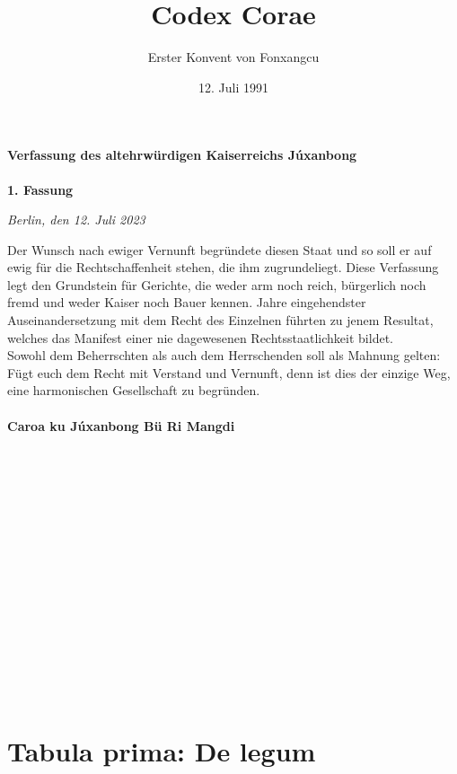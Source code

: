 \documentclass{article}
\title{Codex Corae}
\author{Erster Konvent von Fonxangcu}
\date{12. Juli 1991}
\begin{document}
\maketitle
\vspace*{\fill}
\paragraph{Verfassung des altehrwürdigen Kaiserreichs Júxanbong}

\newpage
{}
\vspace*{\fill}
\begin{Center}
\textbf{1. Fassung}
\end{Center}
\begin{flushright}
\textit{Berlin, den 12. Juli 2023}
\end{flushright}
Der Wunsch nach ewiger Vernunft begründete diesen Staat und so soll er auf ewig für die Rechtschaffenheit stehen, die ihm zugrundeliegt.
Diese Verfassung legt den Grundstein für Gerichte, die weder arm noch reich, bürgerlich noch fremd und weder Kaiser noch Bauer kennen.
Jahre eingehendster Auseinandersetzung mit dem Recht des Einzelnen führten zu jenem Resultat, welches das Manifest einer nie dagewesenen
Rechtsstaatlichkeit bildet.\\
Sowohl dem Beherrschten als auch dem Herrschenden soll als Mahnung gelten: Fügt euch dem Recht mit Verstand und Vernunft, denn ist dies der einzige Weg, eine
harmonischen Gesellschaft zu begründen.
\\\\
\textbf{Caroa ku Júxanbong Bü Ri Mangdi}
\\\\\\\\\\\\\\\\\\\\\\\\\\\\\\\\
\vspace*{\fill}

\newpage
\tableofcontents
\newpage
\section{Tabula prima: De legum}
\end{document}
